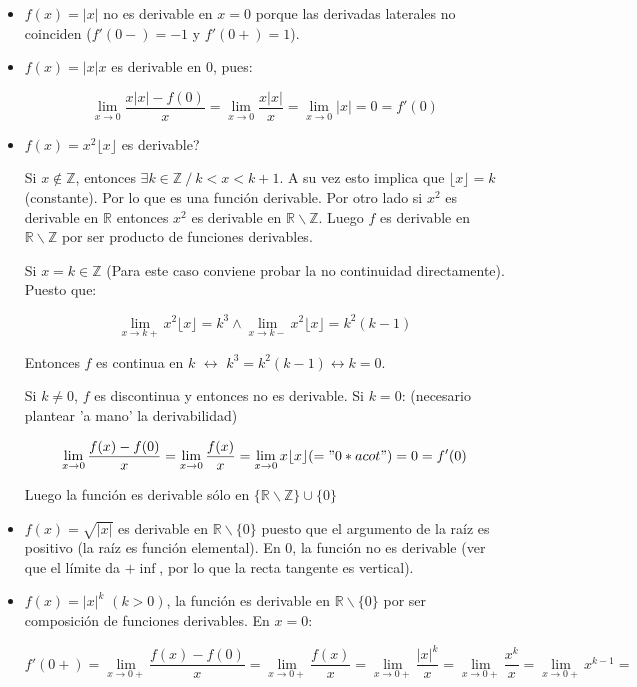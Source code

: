 \documentclass{report}
\begin{document}
			\begin{itemize}
				\item $f(x)=|x|$ no es derivable en $x=0$ porque las derivadas laterales no coinciden ($f'(0-)=-1$ y $f'(0+)=1$).
				\item $f(x)=|x|x$ es derivable en 0, pues:
				
				$$\lim_{x \to 0} \frac{x|x|-f(0)}{x} = \lim_{x \to 0} \frac{x|x|}{x} = \lim_{x \to 0}|x| = 0 = f'(0)$$
				
				\item $f(x)=x^2\lfloor x \rfloor$ es derivable?
				
				Si $x \notin \mathbb{Z}$, entonces $\exists k \in \mathbb{Z} \ / \ k < x <k+1$. A su vez esto implica que $\lfloor x \rfloor = k$ (constante). Por lo que es una función derivable. Por otro lado si $x^2$ es derivable en $\mathbb{R}$ entonces $x^2$ es derivable en $\mathbb{R\backslash Z}$. Luego $f$ es derivable en  $\mathbb{R\backslash Z}$ por ser producto de funciones derivables.
				
				Si $x =k \in \mathbb{Z}$ (Para este caso conviene probar la no continuidad directamente). Puesto que:
				
				$$\lim_{x\to k+}{x^2 \lfloor x \rfloor}=k^3 \wedge \lim_{x\to k-}{x^2 \lfloor x \rfloor}=k^2(k-1)$$
				
				Entonces $f$ es continua en $k$ $\leftrightarrow$ $k^3=k^2(k-1) \leftrightarrow k=0$.
				
				Si $k\neq 0$, $f$ es discontinua y entonces no es derivable. Si $k = 0$: (necesario plantear 'a mano' la derivabilidad)
				
				$$\lim_{x \to 0}\frac{f(x)-f(0)}{x} = \lim_{x \to 0}\frac{f(x)}{x} = \lim_{x \to 0}x \lfloor x \rfloor (= "0*acot") = 0 = f'(0)$$
				
				Luego la función es derivable sólo en $\{\mathbb{R}\backslash \mathbb{Z}\} \cup \{0\}$
				
				\item $f(x)=\sqrt{|x|}$ es derivable en $\mathbb{R}\backslash \{0\}$ puesto que el argumento de la raíz es positivo (la raíz es función elemental). En 0, la función no es derivable (ver que el límite da $+ \inf$, por lo que la recta tangente es vertical).
				
				\item $f(x)=|x|^{k}$ $(k>0)$, la función es derivable en $\mathbb{R}\backslash \{0\}$ por ser composición de funciones derivables. En $x=0$:
				
				$$f'(0+) = \lim_{x \to 0+}{\frac{f(x)-f(0)}{x}} = \lim_{x \to 0+}{\frac{f(x)}{x}} = \lim_{x \to 0+}{\frac{|x|^{k}}{x}} = \lim_{x \to 0+}{\frac{x^{k}}{x}} = \lim_{x \to 0+}{x^{k-1}} = $$
				

\end{itemize}
\end{document}
